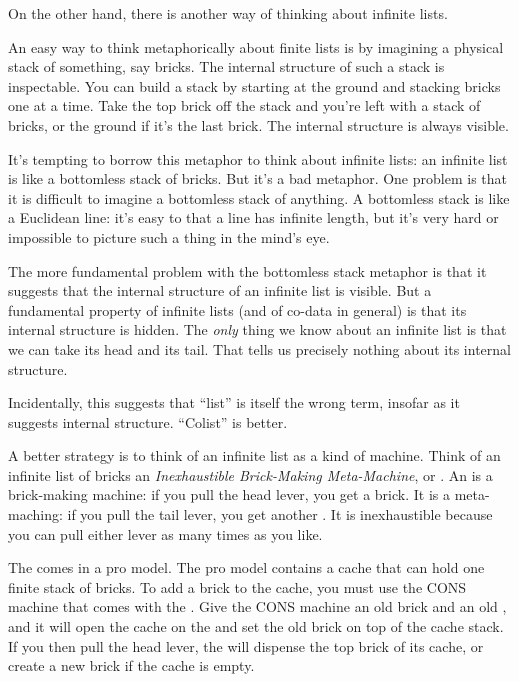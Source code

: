 \documentclass{article}
\begin{document}
On the other hand, there is another way of thinking about infinite
lists.

An easy way to think metaphorically about finite lists is by imagining
a physical stack of something, say bricks. The internal structure of
such a stack is inspectable. You can build a stack by starting at the
ground and stacking bricks one at a time. Take the top brick off the
stack and you're left with a stack of bricks, or the ground if it's the
last brick.  The internal structure is always visible.

It's tempting to borrow this metaphor to think about infinite lists:
an infinite list is like a bottomless stack of bricks. But it's a bad
metaphor. One problem is that it is difficult to imagine a bottomless
stack of anything. A bottomless stack is like a Euclidean line: it's
easy to  that a line has infinite length, but it's very hard
or impossible to picture such a thing in the mind's eye.

The more fundamental problem with the bottomless stack metaphor is
that it suggests that the internal structure of an infinite list is
visible. But a fundamental property of infinite lists (and of co-data
in general) is that its internal structure is hidden. The
\textit{only} thing we know about an infinite list is that we can take
its head and its tail. That tells us precisely nothing about its
internal structure.

Incidentally, this suggests that ``list'' is itself the wrong term,
insofar as it suggests internal structure. ``Colist'' is better.

A better strategy is to think of an infinite list as a kind of
machine. Think of an infinite list of bricks an \textit{Inexhaustible
  Brick-Making Meta-Machine}, or \IBMMM. An \IBMMM is a brick-making
machine: if you pull the \textsf{head} lever, you get a brick. It is a
meta-maching: if you pull the \textsf{tail} lever, you get another
\IBMMM. It is inexhaustible because you can pull either lever as many
times as you like.

The \IBMMM comes in a pro model. The pro model contains a cache that
can hold one finite stack of bricks. To add a brick to the cache, you
must use the \textsf{CONS} machine that comes with the \IBMMM. Give
the \textsf{CONS} machine an old brick and an old \IBMMM, and it will
open the cache on the \IBMMM and set the old brick on top of the cache
stack. If you then pull the \textsf{head} lever, the \IBMMM will
dispense the top brick of its cache, or create a new brick if the
cache is empty.
\end{document}
